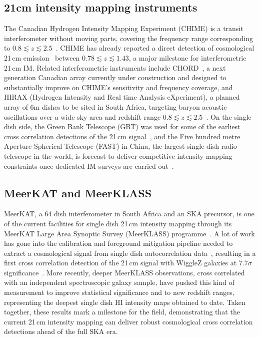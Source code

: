 \subsection{21cm intensity mapping instruments}

The Canadian Hydrogen Intensity Mapping Experiment (CHIME) is a transit interferometer without moving parts, covering the frequency range corresponding to $0.8\lesssim z\lesssim2.5$~\citep{Bandura:2014gwa}. CHIME has already reported a direct detection of cosmological 21\,cm emission~\citep{CHIMEdetection} between $0.78\lesssim z\lesssim 1.43$, a major milestone for interferometric 21\,cm IM. Related interferometric instruments include CHORD~\citep{thechordcollaboration2026overviewcanadianhydrogenobservatory}, a next generation Canadian array currently under construction and designed to substantially improve on CHIME's sensitivity and frequency coverage, and HIRAX (Hydrogen Intensity and Real time Analysis eXperiment), a planned array of 6m dishes to be sited in South Africa, targeting baryon acoustic oscillations over a wide sky area and redshift range $0.8\lesssim z\lesssim2.5$~\citep{Newburgh:2016mwi}. On the single dish side, the Green Bank Telescope (GBT) was used for some of the earliest cross correlation detections of the 21\,cm signal~\citep{Masui2013,Wolz2022}, and the Five hundred metre Aperture Spherical Telescope (FAST) in China, the largest single dish radio telescope in the world, is forecast to deliver competitive intensity mapping constraints once dedicated IM surveys are carried out~\citep{Hu:2019okh}.

\subsection{MeerKAT and MeerKLASS}

MeerKAT, a 64 dish interferometer in South Africa and an SKA precursor, is one of the current facilities for single dish 21\,cm intensity mapping through its MeerKAT Large Area Synoptic Survey (MeerKLASS) programme~\citep{Santos:2017,meerklass_deepfield_2025}. A lot of work has gone into the calibration and foreground mitigation pipeline needed to extract a cosmological signal from single dish autocorrelation data~\citep{Wang:2021,irfan2022}, resulting in a first cross correlation detection of the 21\,cm signal with WiggleZ galaxies at $7.7\sigma$ significance~\citep{Cunnington:2022uzo}. More recently, deeper MeerKLASS observations, cross correlated with an independent spectroscopic galaxy sample, have pushed this kind of measurement to improve statistical significance and to new redshift ranges, representing the deepest single dish HI intensity maps obtained to date. Taken together, these results mark a milestone for the field, demonstrating that the current 21\,cm intensity mapping can deliver robust cosmological cross correlation detections ahead of the full SKA era.

